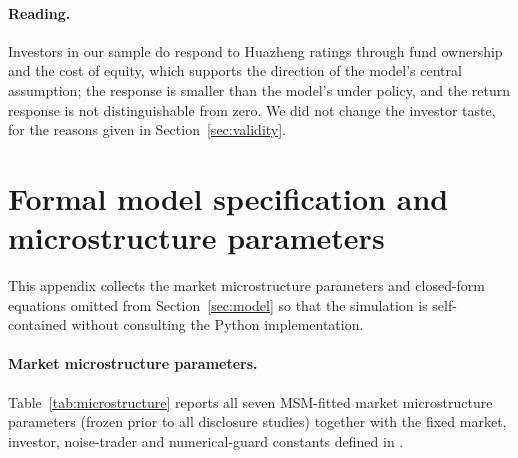 \documentclass[11pt]{article}
\begin{document}
\paragraph{Reading.} Investors in our sample do respond to Huazheng ratings through fund ownership and the cost of equity, which supports the direction of the model's central assumption; the response is smaller than the model's under policy, and the return response is not distinguishable from zero. We did not change the investor taste, for the reasons given in Section~\ref{sec:validity}.

\section{Formal model specification and microstructure parameters}\label{app:formal}

This appendix collects the market microstructure parameters and closed-form equations omitted from Section~\ref{sec:model} so that the simulation is self-contained without consulting the Python implementation.

\paragraph{Market microstructure parameters.}
Table~\ref{tab:microstructure} reports all seven MSM-fitted market microstructure parameters (frozen prior to all disclosure studies) together with the fixed market, investor, noise-trader and numerical-guard constants defined in .
\end{document}
